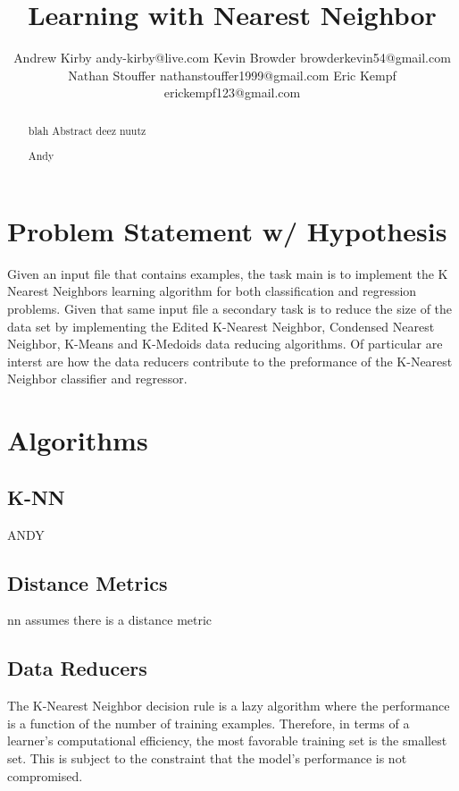 \documentclass[twoside,11pt]{article}
\begin{document}
\title{Learning with Nearest Neighbor}

\author{\name Andrew Kirby \email andy-kirby@live.com \AND
		\name Kevin Browder \email browderkevin54@gmail.com \AND
		\name Nathan Stouffer \email nathanstouffer1999@gmail.com \AND
		\name Eric Kempf \email erickempf123@gmail.com }

\maketitle

\begin{abstract}
	blah Abstract deez nuutz
	
	Andy 
	
\end{abstract}

\section{Problem Statement w/ Hypothesis}

Given an input file that contains examples, the task main is to implement the K Nearest Neighbors learning algorithm for both classification and regression problems. Given that same input file a secondary task is to reduce the size of the data set by implementing the Edited K-Nearest Neighbor, Condensed Nearest Neighbor, K-Means and K-Medoids data reducing algorithms. Of particular are interst are how the data reducers contribute to the preformance of the K-Nearest Neighbor classifier and regressor.

\section{Algorithms}

\subsection{K-NN}

ANDY

\subsection{Distance Metrics}

nn assumes there is a distance metric

\subsection{Data Reducers}
The K-Nearest Neighbor decision rule is a lazy algorithm where the performance is a function of the number of training examples. Therefore, in terms of a learner's computational efficiency, the most favorable training set is the smallest set.
This is subject to the constraint that the model's performance is not compromised.
\end{document}
